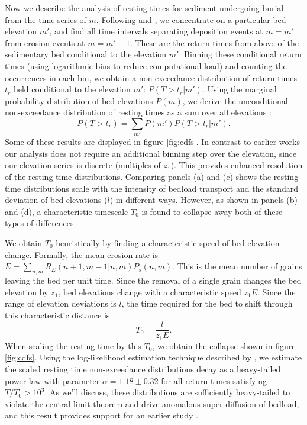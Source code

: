 \documentclass[draft]{agujournal2018}
\newcommand\be{\begin{equation}} %
\newcommand\ee{\end{equation}}   %
\begin{document}
Now we describe the analysis of resting times for sediment undergoing burial from the time-series of $m$.
Following \citet{Voepel2013} and \citet{Martin2014}, we concentrate on a particular bed elevation $m'$, and find all time intervals separating deposition events at $m=m'$ from erosion events at $m=m'+1$.
These are the return times from above of the sedimentary bed conditional to the elevation $m'$.
Binning these conditional return times (using logarithmic bins to reduce computational load) and counting the occurrences in each bin, we obtain a non-exceedance distribution of return times $t_r$ held conditional to the elevation $m'$: $P(T>t_r|m')$.
Using the marginal probability distribution of bed elevations $P(m)$, we derive the unconditional non-exceedance distribution of resting times as a sum over all elevations \citep{Yang1971, Nakagawa1980, Voepel2013, Martin2014}:
\be P(T>t_r) = \sum_{m'} P(m') P(T>t_r|m') .\ee
Some of these results are displayed in figure \ref{fig:cdfs}.
In contrast to earlier works our analysis does not require an additional binning step over the elevation, since our elevation series is discrete (multiples of $z_1$).
This provides enhanced resolution of the resting time distributions.
Comparing panels (a) and (c) shows the resting time distributions scale with the intensity of bedload transport and the standard deviation of bed elevations ($l$) in different ways.
However, as shown in panels (b) and (d), a characteristic timescale $T_0$ is found to collapse away both of these types of differences.


We obtain $T_0$ heuristically by finding a characteristic speed of bed elevation change.
Formally, the mean erosion rate is $E = \sum_{n,m}R_E(n+1,m-1|n,m)P_s(n,m)$.
This is the mean number of grains leaving the bed per unit time.
Since the removal of a single grain changes the bed elevation by $z_1$, bed elevations change with a characteristic speed $z_1 E$.
Since the range of elevation deviations is $l$, the time required for the bed to shift through this characteristic distance is
\be T_0 = \frac{l}{z_1 E}.\label{eq:time}\ee
When scaling the resting time by this $T_0$, we obtain the collapse shown in figure \ref{fig:cdfs}.
Using the log-likelihood estimation technique described by \citet{Newman2005}, we estimate the scaled resting time non-exceedance distributions decay as a heavy-tailed power law with parameter $\alpha = 1.18 \pm 0.32$ for all return times satisfying $T/T_0 > 10^3$.
As we'll discuss, these distributions are sufficiently heavy-tailed to violate the central limit theorem and drive anomalous super-diffusion of bedload, and this result provides support for an earlier study \citep[e.g.][]{Martin2014}.
\end{document}

